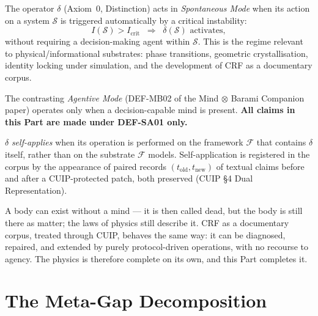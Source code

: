 \documentclass[12pt, a4paper]{article}
\begin{document}
\begin{formalbox}[title={DEF-SA01: $\delta$ in Spontaneous Mode}]
The operator $\delta$ (Axiom~0, Distinction) acts in
\emph{Spontaneous Mode} when its action on a system $\mathcal{S}$
is triggered automatically by a critical instability:
\[
  I(\mathcal{S}) > I_{\mathrm{crit}}
  \;\;\Longrightarrow\;\;
  \delta(\mathcal{S}) \text{ activates},
\]
without requiring a decision-making agent within $\mathcal{S}$.
This is the regime relevant to physical/informational substrates:
phase transitions, geometric crystallisation, identity locking under
simulation, and the development of CRF as a documentary corpus.

The contrasting \emph{Agentive Mode} (DEF-MB02 of the Mind $\otimes$
Barami Companion paper) operates only when a decision-capable mind
is present. \textbf{All claims in this Part are made under DEF-SA01
only.}
\end{formalbox}

\begin{formalbox}[title={DEF-SA02: Self-Application of $\delta$}]
$\delta$ \emph{self-applies} when its operation is performed on the
framework $\mathcal{F}$ that contains $\delta$ itself, rather than on
the substrate $\mathcal{F}$ models. Self-application is registered in
the corpus by the appearance of paired records
$(t_{\mathrm{old}}, t_{\mathrm{new}})$ of textual claims before and
after a CUIP-protected patch, both preserved (CUIP §4 Dual
Representation).
\end{formalbox}

\begin{keybox}[title={The reason this Part is self-contained}]
A body can exist without a mind --- it is then called dead, but the
body is still there as matter; the laws of physics still describe
it. CRF as a documentary corpus, treated through CUIP, behaves the
same way: it can be diagnosed, repaired, and extended by purely
protocol-driven operations, with no recourse to agency. The physics
is therefore complete on its own, and this Part completes it.
\end{keybox}

\section{The Meta-Gap Decomposition}
\end{document}
